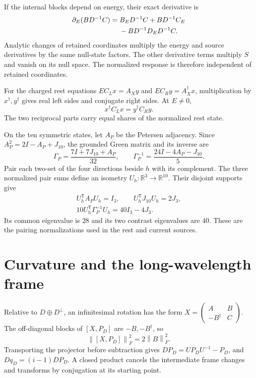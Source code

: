 \documentclass[aps,prx,reprint,longbibliography]{revtex4-2}
\providecommand{\R}{\mathbb R}
\providecommand{\norm}[1]{\left\lVert#1\right\rVert}
\begin{document}
If the internal blocks depend on energy, their exact derivative is
\begin{align}
 \partial_E(BD^{-1}C)={}&B_ED^{-1}C+BD^{-1}C_E\notag\\
 &-BD^{-1}D_ED^{-1}C.
 \label{ap:energyderivative}
\end{align}
Analytic changes of retained coordinates multiply the energy and source derivatives by the same null-state factors. The other derivative terms multiply $S$ and vanish on its null space. The normalized response is therefore independent of retained coordinates.

For the charged rest equations $EC_Lx=A_Xy$ and $EC_Ry=A_X^\dagger x$, multiplication by $x^\dagger,y^\dagger$ gives real left sides and conjugate right sides. At $E\ne0$,
\begin{equation}
 x^\dagger C_Lx=y^\dagger C_Ry.
 \label{ap:equalrestweights}
\end{equation}
The two reciprocal parts carry equal shares of the normalized rest state.

On the ten symmetric states, let $A_P$ be the Petersen adjacency. Since $A_P^2=2I-A_P+J_{10}$, the grounded Green matrix and its inverse are
\begin{equation}
 \Gamma_P=\frac{7I+7J_{10}+A_P}{32},\qquad
 \Gamma_P^{-1}=\frac{24I-4A_P-J_{10}}5.
 \label{ap:grounded}
\end{equation}
Pair each two-set of the four directions beside $h$ with its complement. The three normalized pair sums define an isometry $U_h:\R^3\to\R^{10}$. Their disjoint supports give
\begin{equation}
 \begin{gathered}
 U_h^{\mathsf T}A_PU_h=I_3,\qquad
 U_h^{\mathsf T}J_{10}U_h=2J_3,\\
 10U_h^{\mathsf T}\Gamma_P^{-1}U_h=40I_3-4J_3.
 \end{gathered}
 \label{ap:paircompression}
\end{equation}
Its common eigenvalue is $28$ and its two contrast eigenvalues are $40$. These are the pairing normalizations used in the rest and current sources.

\section{Curvature and the long-wavelength frame}
\label{app:fields}

Relative to $D\oplus D^\perp$, an infinitesimal rotation has the form $X=\left(\begin{smallmatrix}A&B\\-B^\dagger&C\end{smallmatrix}\right)$. The off-diagonal blocks of $[X,P_D]$ are $-B,-B^\dagger$, so
\begin{equation}
 \norm{[X,P_D]}_F^2=2\norm{B}_F^2.
 \label{ap:massform}
\end{equation}
Transporting the projector before subtraction gives $DP_D=UP_DU^{-1}-P_D$, and $Dq_D=(i-1)DP_D$. A closed product cancels the intermediate frame changes and transforms by conjugation at its starting point.
\end{document}
